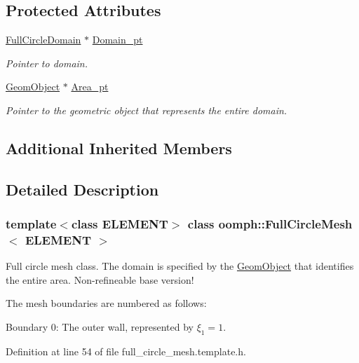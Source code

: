 \subsection*{Protected Attributes}
\begin{DoxyCompactItemize}
\item 
\hyperlink{classoomph_1_1FullCircleDomain}{Full\+Circle\+Domain} $\ast$ \hyperlink{classoomph_1_1FullCircleMesh_a042c0729727a71bee0660f44c33f8691}{Domain\+\_\+pt}
\begin{DoxyCompactList}\small\item\em Pointer to domain. \end{DoxyCompactList}\item 
\hyperlink{classoomph_1_1GeomObject}{Geom\+Object} $\ast$ \hyperlink{classoomph_1_1FullCircleMesh_a0eb9088080115746b8570264f444c37f}{Area\+\_\+pt}
\begin{DoxyCompactList}\small\item\em Pointer to the geometric object that represents the entire domain. \end{DoxyCompactList}\end{DoxyCompactItemize}
\subsection*{Additional Inherited Members}


\subsection{Detailed Description}
\subsubsection*{template$<$class E\+L\+E\+M\+E\+NT$>$\newline
class oomph\+::\+Full\+Circle\+Mesh$<$ E\+L\+E\+M\+E\+N\+T $>$}

Full circle mesh class. The domain is specified by the \hyperlink{classoomph_1_1GeomObject}{Geom\+Object} that identifies the entire area. Non-\/refineable base version! 

The mesh boundaries are numbered as follows\+:
\begin{DoxyItemize}
\item Boundary 0\+: The outer wall, represented by $\xi_1 = 1$.
\end{DoxyItemize}

Definition at line 54 of file full\+\_\+circle\+\_\+mesh.\+template.\+h.



